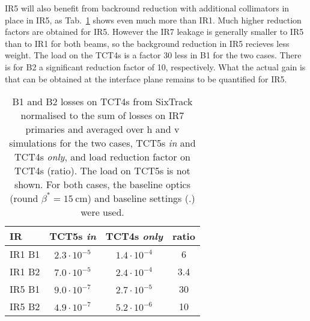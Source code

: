 
IR5 will also benefit from backround reduction with additional collimators in place in IR5, as Tab.~\ref{tab:compLosses} shows even much more than IR1. Much higher reduction factors are obtained for IR5. However the IR7 leakage is generally smaller to IR5 than to IR1 for both beams, so the background reduction in IR5 recieves less weight. The load on the TCT4s is a factor 30 less in B1 for the two cases. There is for B2 a significant reduction factor of 10, respectively. What the actual gain is that can be obtained at the interface plane remains to be quantified for IR5. 


\begin{table}%
   \centering
   \caption{B1 and B2 losses on TCT4s from SixTrack normalised to the sum of losses on IR7 primaries and averaged over h and v simulations for the two cases, TCT5s \textit{in} and TCT4s \textit{only}, and load reduction factor on TCT4s (ratio). The load on TCT5s is not shown. For both cases, the baseline optics (round $\beta^* = 15~$cm) and baseline settings (\twosigmaret.) were used.} 
   \begin{tabular}{l|c|c|c}
       \hline
       IR & TCT5s \textit{in} &  TCT4s \textit{only} & ratio \\
       \hline\hline
       IR1 B1 & $2.3 \cdot 10^{-5}$ & $1.4 \cdot 10^{-4}$ & 6\\
       IR1 B2 & $7.0 \cdot 10^{-5}$ & $2.4 \cdot 10^{-4}$ & 3.4 \\ 
       IR5 B1 & $9.0 \cdot 10^{-7}$ & $2.7 \cdot 10^{-5}$ & 30\\
       IR5 B2 & $4.9 \cdot 10^{-7}$ & $5.2 \cdot 10^{-6}$ & 10\\
       \hline
   \end{tabular}
   \label{tab:compLosses}
\end{table}




